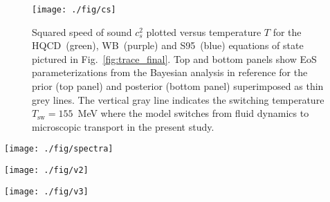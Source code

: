 \documentclass[aps,prc,reprint,amsmath,nofootinbib,superscriptaddress]{revtex4-1}
\newcommand{\hotqcd}{HQCD~}
\newcommand{\wb}{WB~}
\newcommand{\spv}{S95~}
\begin{document}
\begin{figure}
  \texttt{[image: ./fig/cs]}
  \caption{\label{fig:cs} Squared speed of sound $c_s^2$ plotted versus temperature $T$ for the \hotqcd (green), \wb (purple) and \spv (blue) equations of state pictured in 
           Fig.~\ref{fig:trace_final}. Top and bottom panels show EoS parameterizations from the Bayesian analysis in reference \cite{Pratt:2015zsa} for the prior (top panel) and posterior 
           (bottom panel) superimposed as thin grey lines. The vertical gray line indicates the switching temperature $T_\text{sw} = 155$~MeV where the model switches from fluid 
           dynamics to microscopic transport in the present study.}
\end{figure}

\begin{figure*}[t]
  \texttt{[image: ./fig/spectra]}
  \caption{
    \label{fig:spectra} Effect of the equation of state on transverse momentum spectra. Top row: model calculations using the \hotqcd equation of state plotted against 
    PHENIX data for pions, kaons and protons (blue lines/circles, red lines/squares and green lines/triangles) in centrality bins $0$--$5\%$, $20$--$30\%$ and $40$--$50\%$ 
    (columns left to right). Middle and bottom rows: ratios of the \wb and \spv invariant yields to the \hotqcd result. Shaded bands indicate two sigma statistical error. }
\end{figure*}

\begin{figure*}[t]
  \texttt{[image: ./fig/v2]}
  \caption{
    \label{fig:v2} Effect of the equation of state on differential elliptic flow $v_2(p_T)$ calculated from the Cooper-Frye freezeout hypersurface \eqref{differential_flow}.
    Top row: model calculations using the \hotqcd equation of state for the elliptic flow $v_2(p_T)$  of pions, kaons and protons (blue, orange and green lines) 
    in centrality bins $0$--$10\%$, $20$--$30\%$ and $40$--$50\%$ (columns left to right). Middle and bottom rows: ratios of the \wb and \spv elliptic flow to 
    the \hotqcd result. Statistical errors are smaller than the linewidth and have been omitted.
  }
\end{figure*}

\begin{figure*}[t]
  \texttt{[image: ./fig/v3]}
  \caption{
    \label{fig:v3} Same as Fig.~\ref{fig:v2} but for differential triangular flow $v_3(p_T)$. Note that the y-axis limits in the top row are different.
  }
\end{figure*}
\end{document}
